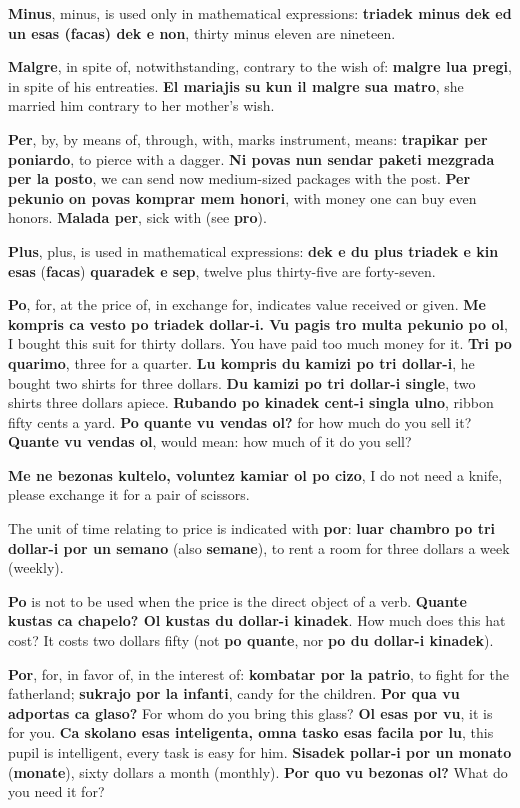 \textbf{Minus}, minus, is used only in mathematical expressions: \textbf{triadek minus dek ed un esas (facas) dek e non}, thirty minus eleven are nineteen.

\textbf{Malgre}, in spite of, notwithstanding, contrary to the wish of: \textbf{malgre lua pregi}, in spite of his entreaties. \textbf{El mariajis su kun il malgre sua matro}, she married him contrary to her mother's wish.

\textbf{Per}, by, by means of, through, with, marks instrument, means: \textbf{trapikar per poniardo}, to pierce with a dagger. \textbf{Ni povas nun sendar paketi mezgrada per la posto}, we can send now medium-sized packages with the post. \textbf{Per pekunio on povas komprar mem honori}, with money one can buy even honors. \textbf{Malada per}, sick with (see \textbf{pro}).

\textbf{Plus}, plus, is used in mathematical expressions: \textbf{dek e du plus triadek e kin esas }(\textbf{facas})\textbf{ quaradek e sep}, twelve plus thirty-five are forty-seven.

\textbf{Po}, for, at the price of, in exchange for, indicates value received or given. \textbf{Me kompris ca vesto po triadek dollar-i. Vu pagis tro multa pekunio po ol}, I bought this suit for thirty dollars. You have paid too much money for it. \textbf{Tri po quarimo}, three for a quarter. \textbf{Lu kompris du kamizi po tri dollar-i}, he bought two shirts for three dollars. \textbf{Du kamizi po tri dollar-i single}, two shirts three dollars apiece. \textbf{Rubando po kinadek cent-i singla ulno}, ribbon fifty cents a yard. \textbf{Po quante vu vendas ol?} for how much do you sell it? \textbf{Quante vu vendas ol}, would mean: how much of it do you sell?

\textbf{Me ne bezonas kultelo, voluntez kamiar ol po cizo}, I do not need a knife, please exchange it for a pair of scissors.

The unit of time relating to price is indicated with \textbf{por}: \textbf{luar chambro po tri dollar-i por un semano} (also \textbf{semane}), to rent a room for three dollars a week (weekly).

\textbf{Po} is not to be used when the price is the direct object of a verb. \textbf{Quante kustas ca chapelo? Ol kustas du dollar-i kinadek}. How much does this hat cost? It costs two dollars fifty (not \textbf{po quante}, nor \textbf{po du dollar-i kinadek}).

\textbf{Por}, for, in favor of, in the interest of: \textbf{kombatar por la patrio}, to fight for the fatherland; \textbf{sukrajo por la infanti}, candy for the children. \textbf{Por qua vu adportas ca glaso?} For whom do you bring this glass? \textbf{Ol esas por vu}, it is for you. \textbf{Ca skolano esas inteligenta, omna tasko esas facila por lu}, this pupil is intelligent, every task is easy for him. \textbf{Sisadek pollar-i por un monato} (\textbf{monate}), sixty dollars a month (monthly). \textbf{Por quo vu bezonas ol?} What do you need it for?


